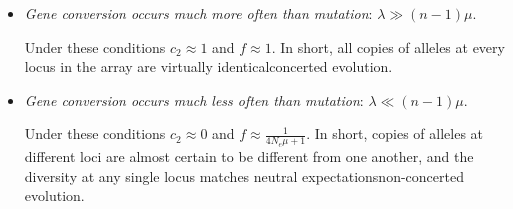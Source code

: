 \begin{itemize}

\item {\it Gene conversion occurs much more often than mutation\/}:
  $\lambda \gg (n-1)\mu$.

Under these conditions $c_2 \approx 1$ and $f \approx 1$. In short,
all copies of alleles at every locus in the array are virtually
identical{\dash}concerted evolution.

\item {\it Gene conversion occurs much less often than mutation\/}:
  $\lambda \ll (n-1)\mu$.

Under these conditions $c_2 \approx 0$ and $f \approx \frac{1}{4N_e\mu
  + 1}$. In short, copies of alleles at different loci are almost
  certain to be different from one another, and the diversity at any
  single locus matches neutral expectations{\dash}non-concerted
  evolution.

\end{itemize}

